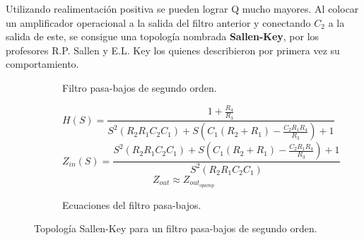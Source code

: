 Utilizando realimentación positiva se pueden lograr Q mucho mayores. Al colocar un amplificador operacional a la salida del filtro anterior y conectando $C_2$ a la salida de este, se consigue una topología nombrada \textbf{Sallen-Key}, por los profesores R.P. Sallen y E.L. Key los quienes describieron por primera vez su comportamiento.

\begin{figure}[H]

	\begin{subfigure}[t]{0.49\textwidth}

		\centering
	\caption{Filtro pasa-bajos de segundo orden.}
	\label{fig:sallenkey}
	\end{subfigure}
	\begin{subfigure}{0.49\textwidth}
		\vspace{-4cm}
		\begin{equation*}
			H(S) = \frac{1+ \frac{R_4}{R_3}}{S^2 (R_2 R_1 C_2 C_1) + S(C_1 (R_2 + R_1) - \frac{C_2 R_1 R_4}{R_3}) + 1} 
		\end{equation*}				
		\begin{equation*}
			Z_{in}(S) = \frac{S^2 (R_2 R_1 C_2 C_1) + S(C_1 (R_2 + R_1) - \frac{C_2 R_1 R_4}{R_3}) + 1}{S^2 (R_2 R_1 C_2 C_1)}
		\end{equation*}
		\begin{equation*}
		Z_{out}\approx Z_{out_{opamp}}
		\end{equation*}
	\caption{Ecuaciones del filtro pasa-bajos.}
	\end{subfigure}
	\caption{Topología Sallen-Key para un filtro pasa-bajos de segundo orden.}
\end{figure}

